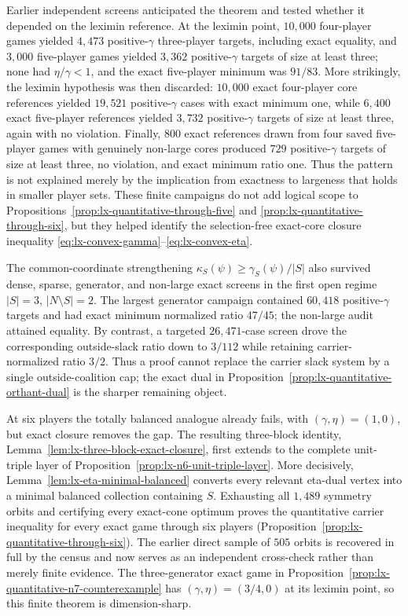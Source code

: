 Earlier independent screens anticipated the theorem and tested whether it
depended on the leximin reference.  At the
leximin point, $10{,}000$ four-player games yielded $4{,}473$ positive-$\gamma$
three-player targets, including exact equality, and $3{,}000$ five-player
games yielded $3{,}362$ positive-$\gamma$ targets of size at least three; none
had $\eta/\gamma<1$, and the exact five-player minimum was $91/83$.  More
strikingly, the leximin hypothesis was then discarded: $10{,}000$ exact
four-player core references yielded $19{,}521$ positive-$\gamma$ cases with
exact minimum one, while $6{,}400$ exact five-player references yielded
$3{,}732$ positive-$\gamma$ targets of size at least three, again with no
violation.  Finally, $800$ exact references drawn from four saved five-player
games with genuinely non-large cores produced $729$ positive-$\gamma$ targets
of size at least three, no violation, and exact minimum ratio one.  Thus the
pattern is not explained merely by the implication from exactness to largeness
that holds in smaller player sets.  These finite campaigns do not add logical
scope to Propositions~\ref{prop:lx-quantitative-through-five} and
\ref{prop:lx-quantitative-through-six}, but they helped identify the
selection-free exact-core closure inequality
\eqref{eq:lx-convex-gamma}--\eqref{eq:lx-convex-eta}.

The common-coordinate strengthening
$\kappa_S(\psi)\geq\gamma_S(\psi)/|S|$ also survived dense, sparse,
generator, and non-large exact screens in the first open regime
$|S|=3$, $|N\setminus S|=2$.  The largest generator campaign contained
$60{,}418$ positive-$\gamma$ targets and had exact minimum normalized ratio
$47/45$; the non-large audit attained equality.  By contrast, a targeted
$26{,}471$-case screen drove the corresponding outside-slack ratio down to
$3/112$ while retaining carrier-normalized ratio $3/2$.  Thus a proof cannot
replace the carrier slack system by a single outside-coalition cap; the exact
dual in Proposition~\ref{prop:lx-quantitative-orthant-dual} is the sharper
remaining object.

At six players the totally balanced analogue already fails, with
$(\gamma,\eta)=(1,0)$, but exact closure removes the gap.  The resulting
three-block identity, Lemma~\ref{lem:lx-three-block-exact-closure}, first
extends to the complete unit-triple layer of
Proposition~\ref{prop:lx-n6-unit-triple-layer}.  More decisively,
Lemma~\ref{lem:lx-eta-minimal-balanced} converts every relevant eta-dual
vertex into a minimal balanced collection containing $S$.  Exhausting all
$1{,}489$ symmetry orbits and certifying every exact-cone optimum proves the
quantitative carrier inequality for every exact game through six players
(Proposition~\ref{prop:lx-quantitative-through-six}).  The earlier direct
sample of $505$ orbits is recovered in full by the census and now serves as
an independent cross-check rather than merely finite evidence.  The
three-generator exact game in
Proposition~\ref{prop:lx-quantitative-n7-counterexample} has
$(\gamma,\eta)=(3/4,0)$ at its leximin point, so this finite theorem is
dimension-sharp.

